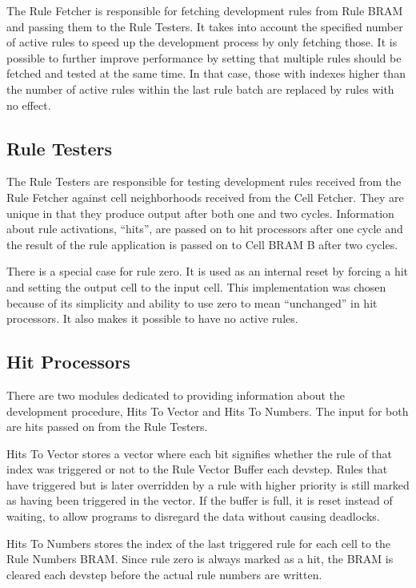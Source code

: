 The Rule Fetcher is responsible for fetching development rules from Rule BRAM and passing them to the Rule Testers.
It takes into account the specified number of active rules to speed up the development process by only fetching those.
It is possible to further improve performance by setting that multiple rules should be fetched and tested at the same time.
In that case, those with indexes higher than the number of active rules within the last rule batch are replaced by rules with no effect.

\subsection{Rule Testers}

The Rule Testers are responsible for testing development rules received from the Rule Fetcher against cell neighborhoods received from the Cell Fetcher.
They are unique in that they produce output after both one and two cycles.
Information about rule activations, ``hits'', are passed on to hit processors after one cycle and the result of the rule application is passed on to Cell BRAM B after two cycles.

There is a special case for rule zero.
It is used as an internal reset by forcing a hit and setting the output cell to the input cell.
This implementation was chosen because of its simplicity and ability to use zero to mean ``unchanged'' in hit processors.
It also makes it possible to have no active rules.

\subsection{Hit Processors}

There are two modules dedicated to providing information about the development procedure, Hits To Vector and Hits To Numbers.
The input for both are hits passed on from the Rule Testers.

Hits To Vector stores a vector where each bit signifies whether the rule of that index was triggered or not to the Rule Vector Buffer each devstep.
Rules that have triggered but is later overridden by a rule with higher priority is still marked as having been triggered in the vector.
If the buffer is full, it is reset instead of waiting, to allow programs to disregard the data without causing deadlocks.

Hits To Numbers stores the index of the last triggered rule for each cell to the Rule Numbers BRAM.
Since rule zero is always marked as a hit, the BRAM is cleared each devstep before the actual rule numbers are written.

